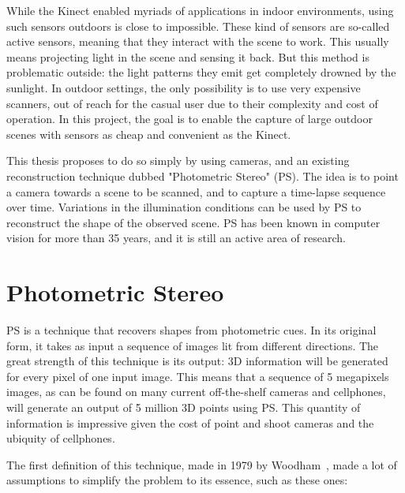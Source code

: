 \documentclass{report}
\begin{document}
While the Kinect enabled myriads of applications in indoor environments, using such sensors outdoors is close to impossible. These kind of sensors are so-called active sensors, meaning that they interact with the scene to work. This usually means projecting light in the scene and sensing it back. But this method is problematic outside: the light patterns they emit get completely drowned by the sunlight. In outdoor settings, the only possibility is to use very expensive scanners, out of reach for the casual user due to their complexity and cost of operation. In this project, the goal is to enable the capture of large outdoor scenes with sensors as cheap and convenient as the Kinect.

This thesis proposes to do so simply by using cameras, and an existing reconstruction technique dubbed "Photometric Stereo" (PS). The idea is to point a camera towards a scene to be scanned, and to capture a time-lapse sequence over time. Variations in the illumination conditions can be used by PS to reconstruct the shape of the observed scene. PS has been known in computer vision for more than 35 years, and it is still an active area of research.

\section{Photometric Stereo}


PS is a technique that recovers shapes from photometric cues. In its original form, it takes as input a sequence of images lit from different directions. The great strength of this technique is its output: 3D information will be generated for every pixel of one input image. This means that a sequence of 5 megapixels images, as can be found on many current off-the-shelf cameras and cellphones, will generate an output of 5 million 3D points using PS. This quantity of information is impressive given the cost of point and shoot cameras and the ubiquity of cellphones.

The first definition of this technique, made in 1979 by Woodham~\cite{Woodham1979}, made a lot of assumptions to simplify the problem to its essence, such as these ones:
\end{document}
